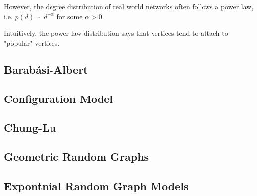 \documentclass{article}
\begin{document}
However, the degree distribution of real world networks often follows a power law, i.e. $p(d)\sim d^{-\alpha}$ for some $\alpha>0$.  

\begin{remark}
    Intuitively, the power-law distribution says that vertices tend to attach to "popular" vertices.
\end{remark}

\subsection{Barab\'{a}si-Albert}

\subsection{Configuration Model}

\subsection{Chung-Lu}

\subsection{Geometric Random Graphs}

\subsection{Expontnial Random Graph Models}




\newpage
\end{document}
